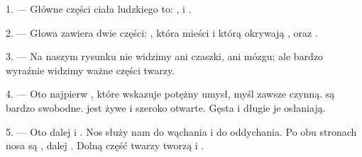 %
%
%

\VUsaut{4.0mm}
\VUsaut{2.0mm}

\VUsaut{2.4mm}
\VUsaut{3.0mm}

\VUsaut{3.0mm}

1. --- Główne części ciała ludzkiego to: ,  i
.

2. --- Głowa zawiera dwie części: , która mieści  i którą
okrywają , oraz .

3. --- Na naszym rysunku nie widzimy ani czaszki, ani mózgu; ale bardzo wyraźnie
widzimy ważne części twarzy.

4. --- Oto najpierw , które wskazuje potężny umysł, myśl zawsze czynną.
 są bardzo swobodne.  jest żywe i szeroko otwarte. Gęsta
 i długie  je osłaniają.

5. --- Oto dalej  i . Nos służy nam do wąchania i do
oddychania. Po obu stronach nosa są , dalej . Dolną część
twarzy tworzą  i .

